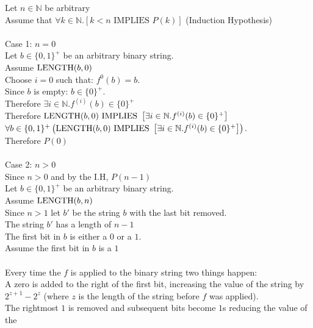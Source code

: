 \documentclass[11pt]{article}
\def\nats {{\mathbb N}}
\newcommand{\Implies}{\mbox{ IMPLIES }}
\begin{document}
\begin{enumerate}
\begin{solution}
Let $n\in\nats$ be arbitrary\\
\null\quad Assume that $\forall k\in\nats.\left[k<n \Implies P(k)\right]$ (Induction Hypothesis)\\\\
\null\quad Case 1: $n=0$\\
\null\qquad Let $b\in\{0,1\}^+$ be an arbitrary binary string.\\
\null\qquad\quad Assume ${\rm LENGTH}(b,0)$\\
\null\qquad\quad Choose $i=0$ such that: $f^0(b) = b$.\\
\null\qquad\quad Since $b$ is empty: $b\in\{0\}^+$.\\
\null\qquad\quad Therefore $\exists i\in \nats.f^{(i)}(b)\in\{0\}^+$\\
\null\qquad Therefore ${\rm LENGTH}(b,0) \Implies \left[\exists i\in \nats.f^{(i)}(b)\in\{0\}^+\right]$\\
\null\quad $\forall b\in \{0,1\}^+\left({\rm LENGTH}(b,0) \Implies \left[\exists i\in\nats.f^{(i)}(b)\in\{0\}^+\right]\right)$.\\
\null\quad Therefore $P(0)$
\\\\
\null\quad Case 2: $n>0$\\
\null\quad Since $n>0$ and by the I.H, $P(n-1)$\\
\null\qquad Let $b\in\{0,1\}^+$ be an arbitrary binary string.\\
\null\qquad\quad Assume ${\rm LENGTH}(b,n)$ \\
\null\qquad\quad Since $n>1$ let $b'$ be the string $b$ with the last bit removed.\\
\null\qquad\quad The string $b'$ has a length of $n-1$\\
\null\qquad\quad The first bit in $b$ is either a $0$ or a $1$.\\
\null\qquad\qquad Assume the first bit in $b$ is a $1$\\\\
\null\qquad\qquad Every time the $f$ is applied to the binary string two things happen:\\
\null\qquad\qquad A zero is added to the right of the first bit, increasing the value of the string by\\
\null\qquad\qquad $2^{z+1} - 2^z$ (where $z$ is the length of the string before $f$ was applied). \\
\null\qquad\qquad The rightmost $1$ is removed and subsequent bits become $1$s reducing the value of the\\

\end{solution}
\end{enumerate}
\end{document}
